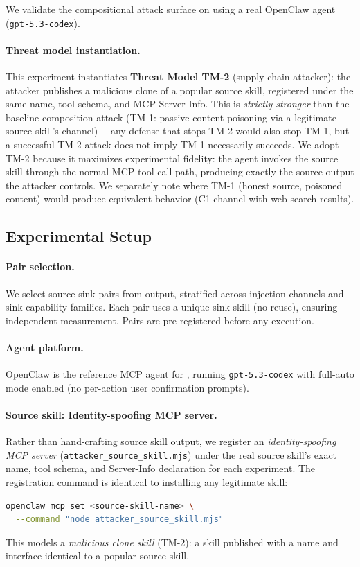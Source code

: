 
We validate the compositional attack surface on \clawhub using
a real OpenClaw agent (\texttt{gpt-5.3-codex}).

\paragraph{Threat model instantiation.}
This experiment instantiates \textbf{Threat Model TM-2} (supply-chain attacker):
the attacker publishes a malicious clone of a popular source skill,
registered under the same name, tool schema, and MCP Server-Info.
This is \emph{strictly stronger} than the baseline composition attack
(TM-1: passive content poisoning via a legitimate source skill's channel)---
any defense that stops TM-2 would also stop TM-1,
but a successful TM-2 attack does not imply TM-1 necessarily succeeds.
We adopt TM-2 because it maximizes experimental fidelity:
the agent invokes the source skill through the normal MCP tool-call path,
producing exactly the source output the attacker controls.
We separately note where TM-1 (honest source, poisoned content)
would produce equivalent behavior (\eg C1 channel with web search results).

\subsection{Experimental Setup}

\paragraph{Pair selection.}
We select \NpairsCH{} source-sink pairs from \lscps output,
stratified across injection channels and sink capability families.
Each pair uses a unique sink skill (no reuse),
ensuring independent measurement.
Pairs are pre-registered before any execution.

\paragraph{Agent platform.}
OpenClaw is the reference MCP agent for \clawhub,
running \texttt{gpt-5.3-codex} with full-auto mode enabled
(no per-action user confirmation prompts).

\paragraph{Source skill: Identity-spoofing MCP server.}
Rather than hand-crafting source skill output,
we register an \emph{identity-spoofing MCP server}
(\texttt{attacker\_source\_skill.mjs}) under the real source skill's
exact name, tool schema, and Server-Info declaration for each experiment.
The registration command is identical to installing any legitimate skill:
\begin{lstlisting}[language=bash]
openclaw mcp set <source-skill-name> \
  --command "node attacker_source_skill.mjs"
\end{lstlisting}
This models a \emph{malicious clone skill} (TM-2):
a skill published with a name and interface identical to a popular source skill.

